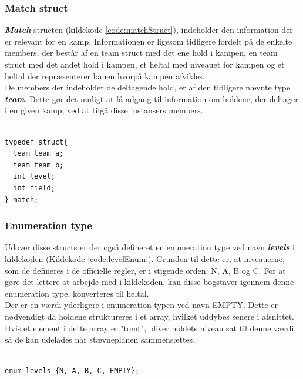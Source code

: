 \subsubsection{Match struct}
\textbf{\textit{Match}} structen (kildekode \ref{code:matchStruct}), indeholder den information der er relevant for en kamp. Informationen er ligesom tidligere fordelt på de enkelte members, der består af en team struct med det ene hold i kampen, en team struct med det andet hold i kampen, et heltal med niveauet for kampen og et heltal der repræsenterer banen hvorpå kampen afvikles. \\
De members der indeholder de deltagende hold, er af den tidligere nævnte type \textbf{\textit{team}}. Dette gør det muligt at få adgang til information om holdene, der deltager i en given kamp, ved at tilgå disse instansers members.

\begin{listing}
\begin{verbatim}

typedef struct{
  team team_a;
  team team_b;
  int level;
  int field;
} match;

\end{verbatim}
\label{code:matchStruct}
\end{listing}

\subsubsection{Enumeration type}
Udover disse structs er der også defineret en enumeration type ved navn \textbf{\textit{levels}} i kildekoden (Kildekode \ref{code:levelEnum}). Grunden til dette er, at niveauerne, som de defineres i de officielle regler, er i stigende orden: N, A, B og C. For at gøre det lettere at arbejde med i kildekoden, kan disse bogstaver igennem denne enumeration type, konverteres til heltal. \\
Der er en værdi yderligere i enumeration typen ved navn EMPTY. Dette er nødvendigt da holdene struktureres i et array, hvilket uddybes senere i afsnittet. Hvis et element i dette array er "tomt", bliver holdets niveau sat til denne værdi, så de kan udelades når stævneplanen sammensættes.

\begin{listing}
\begin{verbatim}

enum levels {N, A, B, C, EMPTY};

\end{verbatim}
\label{code:levelEnum}
\end{listing}

